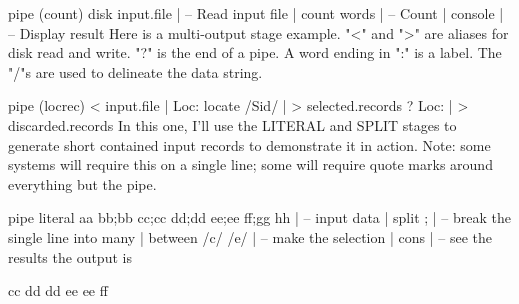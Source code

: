 pipe (count)
  disk input.file | -- Read input file |
  count words | -- Count |
  console | -- Display result
Here is a multi-output stage example. "<" and ">" are aliases for disk read and write. "?" is the end of a pipe.  A word ending in ":" is a label.  The "/"s are used to delineate the data string.

pipe (locrec)
  < input.file | Loc: locate /Sid/ | > selected.records ?
                 Loc:              | > discarded.records
In this one, I'll use the LITERAL and SPLIT stages to generate short contained input records to demonstrate it in action. Note: some systems will require this on a single line; some will require quote marks around everything but the pipe.

pipe literal aa bb;bb cc;cc dd;dd ee;ee ff;gg hh | -- input data |
   split ; | -- break the single line into many |
   between /c/ /e/ | -- make the selection |
   cons | -- see the results
the output is

cc dd
dd ee
ee ff
